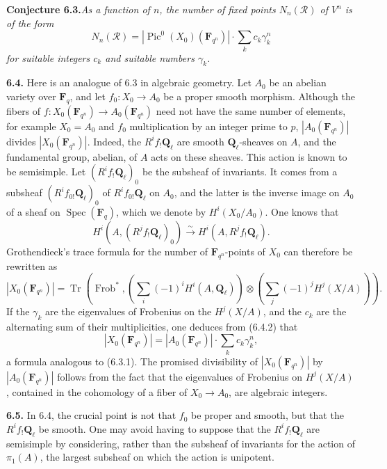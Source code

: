\documentclass[11pt]{article}
\newcommand{\Fq}{\mathbf{F}_q}
\newcommand{\F}{\mathbf{F}}
\newcommand{\Ql}{\mathbf{Q}_{\ell}}
\newcommand{\Spec}{\operatorname{Spec}}
\newcommand{\Frob}{\operatorname{Frob}}
\newcommand{\Pic}{\operatorname{Pic}}
\newcommand{\Tr}{\operatorname{Tr}}
\newcommand{\para}[1]{\medskip\noindent\textbf{#1}\enspace}
\begin{document}
\noindent\textbf{Conjecture 6.3.}\quad\textit{As a function of \(n\), the number of fixed points \(N_n(\mathcal R)\) of \(V^n\) is of the form}
\begin{equation}
  N_n(\mathcal R)=|\Pic^0(X_0)(\F_{q^n})|\cdot \sum_k c_k\gamma_k^n
\tag{6.3.1}
\end{equation}
\textit{for suitable integers \(c_k\) and suitable numbers \(\gamma_k\).}

\para{6.4.} Here is an analogue of 6.3 in algebraic geometry. Let \(A_0\) be an abelian variety over \(\Fq\), and let \(f_0:X_0\to A_0\) be a proper smooth morphism. Although the fibers of \(f:X_0(\F_{q^n})\to A_0(\F_{q^n})\) need not have the same number of elements, for example \(X_0=A_0\) and \(f_0\) multiplication by an integer prime to \(p\), \(|A_0(\F_{q^n})|\) divides \(|X_0(\F_{q^n})|\). Indeed, the \(R^if_!\Ql\) are smooth \(\Ql\)-sheaves on \(A\), and the fundamental group, abelian, of \(A\) acts on these sheaves. This action is known to be semisimple. Let \((R^if_!\Ql)_0\) be the subsheaf of invariants. It comes from a subsheaf \((R^if_{0!}\Ql)_0\) of \(R^if_{0!}\Ql\) on \(A_0\), and the latter is the inverse image on \(A_0\) of a sheaf on \(\Spec(\Fq)\), which we denote by \(H^i(X_0/A_0)\). One knows that
\begin{equation}
  H^i(A,(R^jf_!\Ql)_0)\xrightarrow{\sim}H^i(A,R^jf_!\Ql).
\tag{6.4.1}
\end{equation}
Grothendieck's trace formula for the number of \(\F_{q^n}\)-points of \(X_0\) can therefore be rewritten as
\begin{equation}
  |X_0(\F_{q^n})|
  =\Tr\left(\Frob^*,\left(\sum_i(-1)^iH^i(A,\Ql)\right)\otimes
  \left(\sum_j(-1)^jH^j(X/A)\right)\right).
\tag{6.4.2}
\end{equation}
If the \(\gamma_k\) are the eigenvalues of Frobenius on the \(H^j(X/A)\), and the \(c_k\) are the alternating sum of their multiplicities, one deduces from (6.4.2) that
\begin{equation}
  |X_0(\F_{q^n})|=|A_0(\F_{q^n})|\cdot \sum_k c_k\gamma_k^n,
\tag{6.4.3}
\end{equation}
a formula analogous to (6.3.1). The promised divisibility of \(|X_0(\F_{q^n})|\) by \(|A_0(\F_{q^n})|\) follows from the fact that the eigenvalues of Frobenius on \(H^j(X/A)\), contained in the cohomology of a fiber of \(X_0\to A_0\), are algebraic integers.

\para{6.5.} In 6.4, the crucial point is not that \(f_0\) be proper and smooth, but that the \(R^if_!\Ql\) be smooth. One may avoid having to suppose that the \(R^if_!\Ql\) are semisimple by considering, rather than the subsheaf of invariants for the action of \(\pi_1(A)\), the largest subsheaf on which the action is unipotent.
\end{document}
